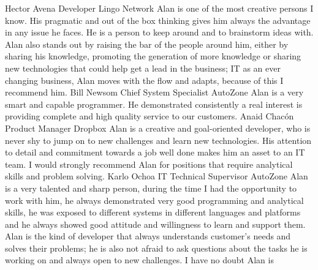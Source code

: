 %
%
%


\begin{referees}
        {Hector Avena}
        {Developer}
        {Lingo Network}
        {Alan is one of the most creative persons I know. His pragmatic and out 
        of the box thinking gives him always the advantage in any issue he 
        faces. He is a person to keep around and to brainstorm ideas with. \\
        Alan also stands out by raising the bar of the people around him, 
        either by sharing his knowledge, promoting the generation of more 
        knowledge or sharing new technologies that could help get a lead in the 
        business; IT as an ever changing business, Alan moves with the flow and 
        adapts, because of this I recommend him.}
        {Bill Newsom}
        {Chief System Specialist}
        {AutoZone}
        {Alan is a very smart and capable programmer. He demonstrated 
        consistently a real interest is providing complete and high quality 
        service to our customers.}
        {Anaid Chacón}
        {Product Manager}
        {Dropbox}
        {Alan is a creative and goal-oriented developer, who is never shy to 
        jump on to new challenges and learn new technologies. His attention to 
        detail and commitment towards a job well done makes him an asset to an 
        IT team. I would strongly recommend Alan for positions that require 
        analytical skills and problem solving.}
        {Karlo Ochoa}
        {IT Technical Supervisor}
        {AutoZone}
        {Alan is a very talented and sharp person, during the time I had the 
        opportunity to work with him, he always demonstrated very good 
        programming and analytical skills, he was exposed to different systems 
        in different languages and platforms and he always showed good attitude 
        and willingness to learn and support them.\\Alan is the kind of 
        developer that always understands customer’s needs and solves their 
        problems; he is also not afraid to ask questions about the tasks he is 
        working on and always open to new challenges. I have no doubt Alan is 
}
\end{referees}
